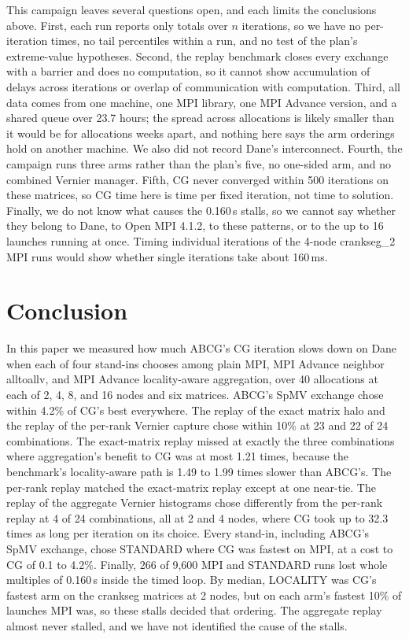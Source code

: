 \documentclass[11pt]{article}
\begin{document}
This campaign leaves several questions open, and each limits the conclusions above.
First, each run reports only totals over $n$ iterations, so we have no per-iteration
times, no tail percentiles within a run, and no test of the plan's extreme-value
hypotheses. Second, the replay benchmark closes every exchange with a barrier and does
no computation, so it cannot show accumulation of delays across iterations or overlap of
communication with computation. Third, all data comes from one machine, one MPI library,
one MPI Advance version, and a shared queue over 23.7 hours; the spread across
allocations is likely smaller than it would be for allocations weeks apart, and nothing
here says the arm orderings hold on another machine. We also did not record Dane's
interconnect. Fourth, the campaign runs three arms rather than the plan's five, no
one-sided arm, and no combined Vernier manager. Fifth, CG never converged within 500
iterations on these matrices, so CG time here is time per fixed iteration, not time to
solution. Finally, we do not know what causes the 0.160\,s stalls, so we cannot say
whether they belong to Dane, to Open MPI 4.1.2, to these patterns, or to the up to 16
launches running at once. Timing individual iterations of the 4-node crankseg\_2 MPI runs
would show whether single iterations take about 160\,ms.

\section{Conclusion}
\label{sec:conclusion}

In this paper we measured how much ABCG's CG iteration slows down on Dane when each of
four stand-ins chooses among plain MPI, MPI Advance neighbor alltoallv, and MPI Advance
locality-aware aggregation, over 40 allocations at each of 2, 4, 8, and 16 nodes and six
matrices. ABCG's SpMV exchange chose within 4.2\% of CG's best everywhere. The replay of
the exact matrix halo and the replay of the per-rank Vernier capture chose within 10\% at
23 and 22 of 24 combinations. The exact-matrix replay missed at exactly the three
combinations where aggregation's benefit to CG was at most 1.21 times, because the
benchmark's locality-aware path is 1.49 to 1.99 times slower than ABCG's. The per-rank
replay matched the exact-matrix replay except at one near-tie. The replay of the
aggregate Vernier histograms chose differently from the per-rank replay at 4 of 24
combinations, all at 2 and 4 nodes, where CG took up to 32.3 times as long per iteration
on its choice. Every stand-in, including ABCG's SpMV exchange, chose STANDARD where CG
was fastest on MPI, at a cost to CG of 0.1 to 4.2\%. Finally, 266 of 9,600 MPI and
STANDARD runs lost whole multiples of 0.160\,s inside the timed loop. By median,
LOCALITY was CG's fastest arm on the crankseg matrices at 2 nodes, but on each arm's
fastest 10\% of launches MPI was, so these stalls decided that ordering. The aggregate
replay almost never stalled, and we have not identified the cause of the stalls.



\end{document}
